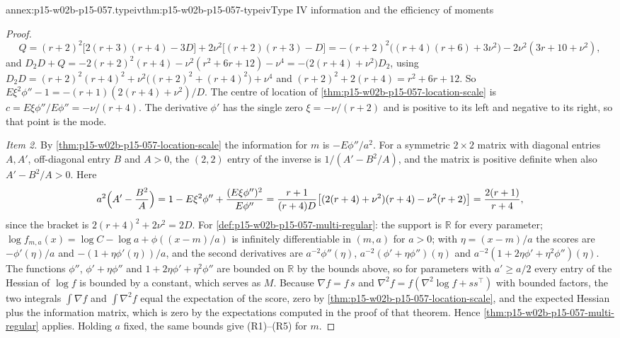 \begin{annexitem}{annex:p15-w02b-p15-057.typeiv}{thm:p15-w02b-p15-057-typeiv}{Type IV information and the efficiency of moments}
\begin{proof}
\[
 Q=(r+2)^2\bigl[2(r+3)(r+4)-3D\bigr]+2\nu^2\bigl[(r+2)(r+3)-D\bigr]
 =-(r+2)^2\bigl((r+4)(r+6)+3\nu^2\bigr)-2\nu^2(3r+10+\nu^2),
\]
and \(D_2D+Q=-2(r+2)^2(r+4)-\nu^2(r^2+6r+12)-\nu^4
=-\bigl(2(r+4)+\nu^2\bigr)D_2\), using
\(D_2D=(r+2)^2(r+4)^2+\nu^2\bigl((r+2)^2+(r+4)^2\bigr)+\nu^4\) and
\((r+2)^2+2(r+4)=r^2+6r+12\). So
\(E\xi^2\phi''-1=-(r+1)(2(r+4)+\nu^2)/D\). The centre of location of
\cref{thm:p15-w02b-p15-057-location-scale} is
\(c=E\xi\phi''/E\phi''=-\nu/(r+4)\). The derivative \(\phi'\) has the
single zero \(\xi=-\nu/(r+2)\) and is positive to its left and negative
to its right, so that point is the mode.

\emph{Item 2.} By \cref{thm:p15-w02b-p15-057-location-scale} the
information for \(m\) is \(-E\phi''/a^2\). For a symmetric \(2\times2\)
matrix with diagonal entries \(A,A'\), off-diagonal entry \(B\) and
\(A>0\), the \((2,2)\) entry of the inverse is \(1/(A'-B^2/A)\), and the
matrix is positive definite when also \(A'-B^2/A>0\). Here
\[
 a^2\Bigl(A'-\frac{B^2}A\Bigr)
 =1-E\xi^2\phi''+\frac{(E\xi\phi'')^2}{E\phi''}
 =\frac{r+1}{(r+4)D}\bigl[(2(r+4)+\nu^2)(r+4)-\nu^2(r+2)\bigr]
 =\frac{2(r+1)}{r+4},
\]
since the bracket is \(2(r+4)^2+2\nu^2=2D\). For
\cref{def:p15-w02b-p15-057-multi-regular}: the support is \(\mathbb R\) for
every parameter; \(\log f_{m,a}(x)=\log C-\log a+\phi((x-m)/a)\) is
infinitely differentiable in \((m,a)\) for \(a>0\); with
\(\eta=(x-m)/a\) the scores are \(-\phi'(\eta)/a\) and
\(-(1+\eta\phi'(\eta))/a\), and the second derivatives are
\(a^{-2}\phi''(\eta)\), \(a^{-2}(\phi'+\eta\phi'')(\eta)\) and
\(a^{-2}(1+2\eta\phi'+\eta^2\phi'')(\eta)\). The functions \(\phi''\),
\(\phi'+\eta\phi''\) and \(1+2\eta\phi'+\eta^2\phi''\) are bounded on
\(\mathbb R\) by the bounds above, so for parameters with \(a'\geq a/2\)
every entry of the Hessian of \(\log f\) is bounded by a constant, which
serves as \(M\). Because \(\nabla f=f\,s\) and
\(\nabla^2f=f(\nabla^2\log f+ss^{\top})\) with bounded factors, the two
integrals \(\int\nabla f\) and \(\int\nabla^2f\) equal the expectation of
the score, zero by \cref{thm:p15-w02b-p15-057-location-scale}, and the
expected Hessian plus the information matrix, which is zero by the
expectations computed in the proof of that theorem. Hence
\cref{thm:p15-w02b-p15-057-multi-regular} applies. Holding \(a\) fixed,
the same bounds give (R1)--(R5) for \(m\).


\end{proof}
\end{annexitem}
